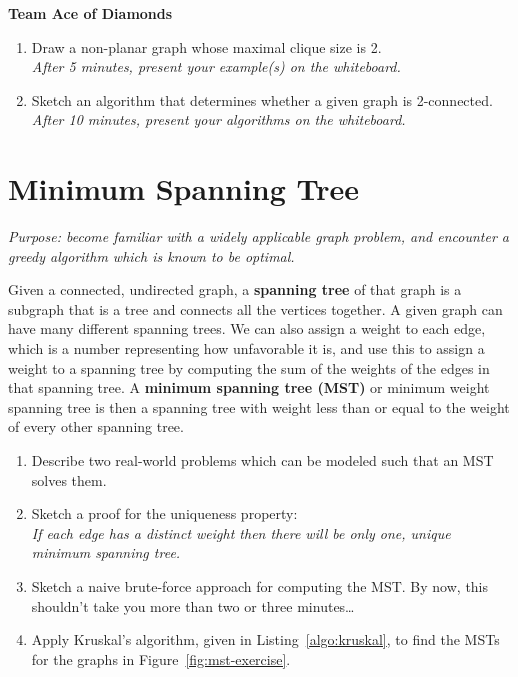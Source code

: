\documentclass[a4paper]{article}
\begin{document}
\vspace{\baselineskip}
\noindent
\textbf{Team Ace of Diamonds}
\begin{enumerate}
\item
  Draw a non-planar graph whose maximal clique size is 2.\\
  \emph{After 5 minutes, present your example(s) on the whiteboard.}
\item
  Sketch an algorithm that determines whether a given graph is 2-connected.\\
  \emph{After 10 minutes, present your algorithms on the whiteboard.}
\end{enumerate}


\clearpage
\section*{Minimum Spanning Tree}

\emph{
  Purpose: become familiar with a widely applicable graph problem, and encounter a greedy algorithm which is known to be optimal.
}

Given a connected, undirected graph, a \textbf{spanning tree} of that graph is a subgraph that is a tree and connects all the vertices together.
A given graph can have many different spanning trees.
We can also assign a weight to each edge, which is a number representing how unfavorable it is, and use this to assign a weight to a spanning tree by computing the sum of the weights of the edges in that spanning tree.
A \textbf{minimum spanning tree (MST)} or minimum weight spanning tree is then a spanning tree with weight less than or equal to the weight of every other spanning tree.

\begin{enumerate}

\item
  Describe two real-world problems which can be modeled such that an MST solves them.
  
\item
  Sketch a proof for the uniqueness property:\\
  \emph{If each edge has a distinct weight then there will be only one, unique minimum spanning tree.}
  
\item
  Sketch a naive brute-force approach for computing the MST.
  By now, this shouldn't take you more than two or three minutes\ldots
  
\item
  Apply Kruskal's algorithm, given in Listing~\ref{algo:kruskal}, to find the MSTs for the graphs in Figure~\ref{fig:mst-exercise}.

\end{enumerate}
\end{document}
